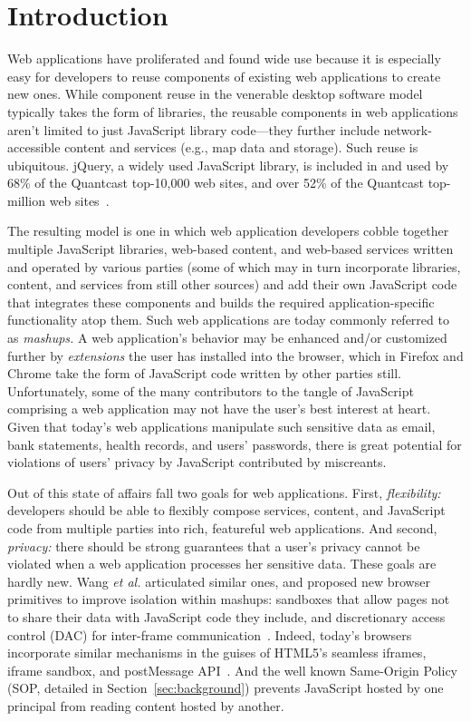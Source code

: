 \section{Introduction}
\label{sec:intro}

Web applications have proliferated and found wide use because it is
especially easy for developers to reuse components of existing web
applications to create new ones. While component reuse in the
venerable desktop software model typically takes the form of
libraries, the reusable components in web applications aren't limited
to just JavaScript library code---they further include
network-accessible content and services (e.g., map data and
storage). Such reuse is ubiquitous. jQuery, a widely used JavaScript
library, is included in and used by 68\% of the Quantcast top-10,000
web sites, and over 52\% of the Quantcast top-million web
sites~\cite{quantcast}.

The resulting model is one in which web application developers cobble
together multiple JavaScript libraries, web-based content, and
web-based services written and operated by various parties (some of
which may in turn incorporate libraries, content, and services from
still other sources) and add their own JavaScript code that integrates
these components and builds the required application-specific
functionality atop them. Such web applications are today commonly
referred to as {\em mashups.} A web application's behavior may be
enhanced and/or customized further by {\em extensions} the
user has installed into the browser, which in Firefox and Chrome take
the form of JavaScript code written by other parties
still. Unfortunately, some of the many contributors to the tangle of
JavaScript comprising a web application may not have the user's best
interest at heart. Given that today's web applications manipulate such
sensitive data as email, bank statements, health records, and users'
passwords, there is great potential for violations of users' privacy
by JavaScript contributed by miscreants.

Out of this state of affairs fall two goals for web
applications. First, {\em flexibility:} developers should be able to
flexibly compose services, content, and JavaScript code from multiple
parties into rich, featureful web applications. And second, {\em
  privacy:} there should be strong guarantees that a user's privacy
cannot be violated when a web application processes her sensitive
data. These goals are hardly new. Wang {\em et al.} articulated
similar ones, and proposed new browser primitives to improve isolation
within mashups: sandboxes that allow pages not to share their data
with JavaScript code they include, and discretionary access control
(DAC) for inter-frame communication~\cite{mashupos}. Indeed, today's
browsers incorporate similar mechanisms in the guises of HTML5's
seamless iframes, iframe sandbox, and postMessage API~\cite{html5}.
And the well known Same-Origin Policy (SOP, detailed in
Section~\ref{sec:background}) prevents JavaScript hosted by one principal from
reading content hosted by another.

